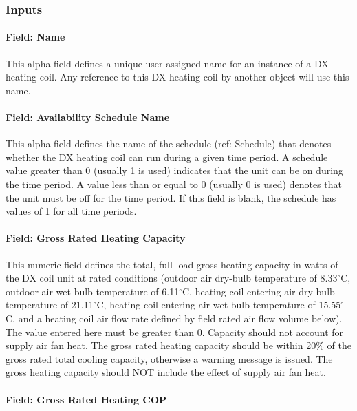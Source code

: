 \subsubsection{Inputs}\label{inputs-19-001}

\paragraph{Field: Name}\label{field-name-18-001}

This alpha field defines a unique user-assigned name for an instance of a DX heating coil. Any reference to this DX heating coil by another object will use this name.

\paragraph{Field: Availability Schedule Name}\label{field-availability-schedule-name-10-000}

This alpha field defines the name of the schedule (ref: Schedule) that denotes whether the DX heating coil can run during a given time period. A schedule value greater than 0 (usually 1 is used) indicates that the unit can be on during the time period. A value less than or equal to 0 (usually 0 is used) denotes that the unit must be off for the time period. If this field is blank, the schedule has values of 1 for all time periods.

\paragraph{Field: Gross Rated Heating Capacity}\label{field-gross-rated-heating-capacity-2}

This numeric field defines the total, full load gross heating capacity in watts of the DX coil unit at rated conditions (outdoor air dry-bulb temperature of 8.33$^\circ$C, outdoor air wet-bulb temperature of 6.11$^\circ$C, heating coil entering air dry-bulb temperature of 21.11$^\circ$C, heating coil entering air wet-bulb temperature of 15.55$^\circ$C, and a heating coil air flow rate defined by field rated air flow volume below). The value entered here must be greater than 0. Capacity should not account for supply air fan heat. The gross rated heating capacity should be within 20\% of the gross rated total cooling capacity, otherwise a warning message is issued. The gross heating capacity should NOT include the effect of supply air fan heat.

\paragraph{Field: Gross Rated Heating COP}\label{field-gross-rated-heating-cop}

